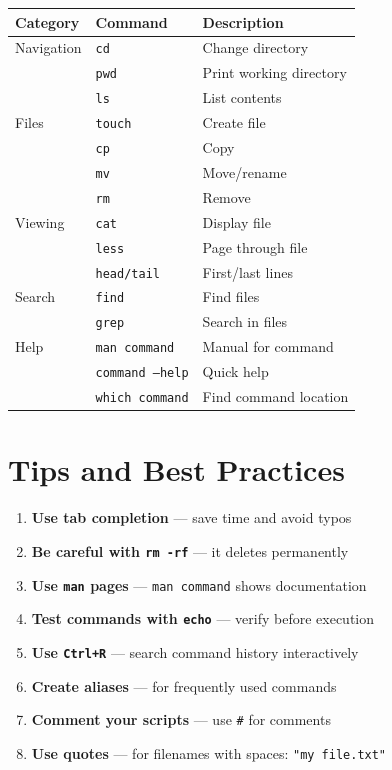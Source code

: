 \documentclass[11pt]{article}
\begin{document}
\begin{center}
\small
\begin{tabular}{lll}
\toprule
Category & Command & Description \\
\midrule
Navigation & \texttt{cd} & Change directory \\
& \texttt{pwd} & Print working directory \\
& \texttt{ls} & List contents \\
\midrule
Files & \texttt{touch} & Create file \\
& \texttt{cp} & Copy \\
& \texttt{mv} & Move/rename \\
& \texttt{rm} & Remove \\
\midrule
Viewing & \texttt{cat} & Display file \\
& \texttt{less} & Page through file \\
& \texttt{head/tail} & First/last lines \\
\midrule
Search & \texttt{find} & Find files \\
& \texttt{grep} & Search in files \\
\midrule
Help & \texttt{man command} & Manual for command \\
& \texttt{command --help} & Quick help \\
& \texttt{which command} & Find command location \\
\bottomrule
\end{tabular}
\end{center}

\section{Tips and Best Practices}

\begin{enumerate}
    \item \textbf{Use tab completion} --- save time and avoid typos
    \item \textbf{Be careful with \texttt{rm -rf}} --- it deletes permanently
    \item \textbf{Use \texttt{man} pages} --- \texttt{man command} shows documentation
    \item \textbf{Test commands with \texttt{echo}} --- verify before execution
    \item \textbf{Use \texttt{Ctrl+R}} --- search command history interactively
    \item \textbf{Create aliases} --- for frequently used commands
    \item \textbf{Comment your scripts} --- use \texttt{\#} for comments
    \item \textbf{Use quotes} --- for filenames with spaces: \texttt{"my file.txt"}
\end{enumerate}
\end{document}
